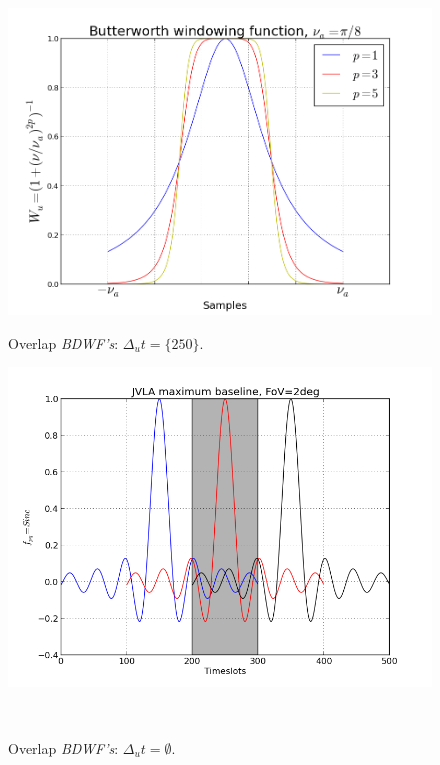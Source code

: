 \documentclass[useAMS,usenatbib]{mn2e}
\begin{document}
\begin{figure}
\begin{minipage}{0.38\linewidth}\includegraphics[width=1\textwidth]{./Figures/Butterwordth.png}\caption{Overlap 
		\textit{BDWF's}: $\Delta_u t=\{250\}$.}\label{fig:fig_4}\end{minipage}
\begin{minipage}{0.38\linewidth}\includegraphics[width=1\textwidth]{./Figures/corrSigVLAMxBl_overlapGdelta.png}\caption{Overlap 
		\textit{BDWF's}: $\Delta_u t=\emptyset$.}\label{fig:fig_5}\end{minipage}\\

\end{figure}
\end{document}
